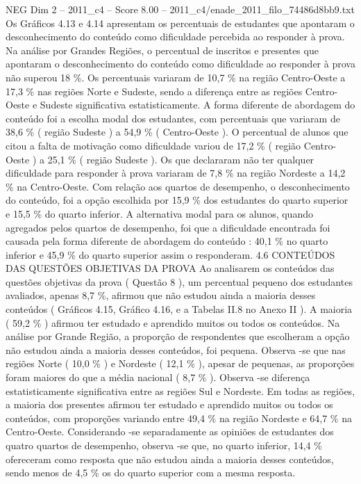 \begin{textsample}{NEG Dim 2 – 2011\_c4 – Score 8.00 – 2011\_c4/enade\_2011\_filo\_74486d8bb9.txt}
Os Gráficos 4.13 e 4.14 apresentam os percentuais de estudantes que apontaram o desconhecimento do conteúdo como dificuldade percebida ao responder à prova.
Na análise por Grandes Regiões, o percentual de inscritos e presentes que apontaram o desconhecimento do conteúdo como dificuldade ao responder à prova não superou 18 \%.
Os percentuais variaram de 10,7 \% na região Centro-Oeste a 17,3 \% nas regiões Norte e Sudeste, sendo a diferença entre as regiões Centro-Oeste e Sudeste significativa estatisticamente.
A forma diferente de abordagem do conteúdo foi a escolha modal dos estudantes, com percentuais que variaram de 38,6 \% ( região Sudeste ) a 54,9 \% ( Centro-Oeste ).
O percentual de alunos que citou a falta de motivação como dificuldade variou de 17,2 \% ( região Centro-Oeste ) a 25,1 \% ( região Sudeste ).
Os que declararam não ter qualquer dificuldade para responder à prova variaram de 7,8 \% na região Nordeste a 14,2 \% na Centro-Oeste.
Com relação aos quartos de desempenho, o desconhecimento do conteúdo, foi a opção escolhida por 15,9 \% dos estudantes do quarto superior e 15,5 \% do quarto inferior.
A alternativa modal para os alunos, quando agregados pelos quartos de desempenho, foi que a dificuldade encontrada foi causada pela forma diferente de abordagem do conteúdo : 40,1 \% no quarto inferior e 45,9 \% do quarto superior assim o responderam. 4.6 CONTEÚDOS DAS QUESTÕES OBJETIVAS DA PROVA Ao analisarem os conteúdos das questões objetivas da prova ( Questão 8 ), um percentual pequeno dos estudantes avaliados, apenas 8,7 \%, afirmou que não estudou ainda a maioria desses conteúdos ( Gráficos 4.15, Gráfico 4.16, e a Tabelas II.8 no Anexo II ).
A maioria ( 59,2 \% ) afirmou ter estudado e aprendido muitos ou todos os conteúdos.
Na análise por Grande Região, a proporção de respondentes que escolheram a opção não estudou ainda a maioria desses conteúdos, foi pequena.
Observa -se que nas regiões Norte ( 10,0 \% ) e Nordeste ( 12,1 \% ), apesar de pequenas, as proporções foram maiores do que a média nacional ( 8,7 \% ).
Observa -se diferença estatisticamente significativa entre as regiões Sul e Nordeste.
Em todas as regiões, a maioria dos presentes afirmou ter estudado e aprendido muitos ou todos os conteúdos, com proporções variando entre 49,4 \% na região Nordeste e 64,7 \% na Centro-Oeste.
Considerando -se separadamente as opiniões de estudantes dos quatro quartos de desempenho, observa -se que, no quarto inferior, 14,4 \% ofereceram como resposta que não estudou ainda a maioria desses conteúdos, sendo menos de 4,5 \% os do quarto superior com a mesma resposta.

\end{textsample}
